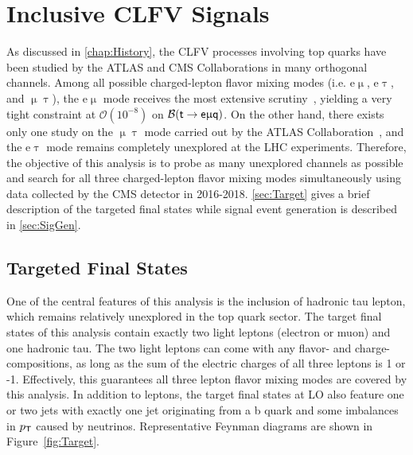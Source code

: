 \chapter{Inclusive CLFV Signals}
\label{chap:Signal}

As discussed in \autoref{chap:History}, the \ac{CLFV} processes involving top quarks have been studied by the \ac{ATLAS} and \ac{CMS} Collaborations in many orthogonal channels. Among all possible charged-lepton flavor mixing modes (i.e. e$\upmu$, e$\uptau$, and $\upmu\uptau$), the e$\upmu$ mode receives the most extensive scrutiny~\cite{ATLAS-CONF-2018-044,CMS:2022ztx,CMS:2023phe}, yielding a very tight constraint at $\mathcal{O}(10^{-8})$ on $\mathcal{B}(\textsf{t}\rightarrow\textsf{e}\upmu\textsf{q})$. On the other hand, there exists only one study on the $\upmu\uptau$ mode carried out by the \ac{ATLAS} Collaboration~\cite{ATLAS-CONF-2023-001}, and the e$\uptau$ mode remains completely unexplored at the \ac{LHC} experiments. Therefore, the objective of this analysis is to probe as many unexplored channels as possible and search for all three charged-lepton flavor mixing modes simultaneously using data collected by the \ac{CMS} detector in 2016-2018. \autoref{sec:Target} gives a brief description of the targeted final states while signal event generation is described in \autoref{sec:SigGen}.
\section{Targeted Final States}
\label{sec:Target}

One of the central features of this analysis is the inclusion of hadronic tau lepton, which remains relatively unexplored in the top quark sector. The target final states of this analysis contain exactly two light leptons (electron or muon) and one hadronic tau. The two light leptons can come with any flavor- and charge-compositions, as long as the sum of the electric charges of all three leptons is 1 or -1. Effectively, this guarantees all three lepton flavor mixing modes are covered by this analysis. In addition to leptons, the target final states at \ac{LO} also feature one or two jets with exactly one jet originating from a b quark and some imbalances in $p_{\textsf{T}}$ caused by neutrinos. Representative Feynman diagrams are shown in Figure~\ref{fig:Target}.

